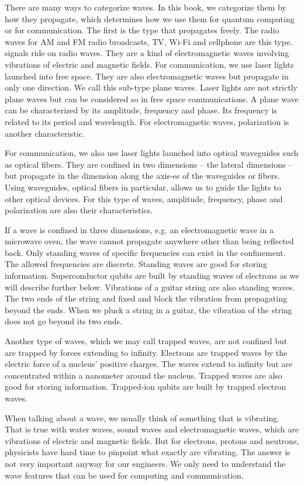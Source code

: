 \documentclass{book}
\begin{document}
There are many ways to categorize waves. In this book, we categorize them by how they propagate, which determines how we use them for quantum computing or for communication. The first is the type that propagates freely. The radio waves for AM and FM radio broadcasts, TV, Wi-Fi and cellphone are this type. signals ride on radio waves. They are a kind of electromagnetic waves involving vibrations of electric and magnetic fields. For communication, we use laser lights launched into free space. They are also electromagnetic waves but propagate in only one direction. We call this sub-type plane waves. Laser lights are not strictly plane waves but can be considered so in free space communications. A plane wave can be characterized by its amplitude, frequency and phase. Its frequency is related to its period and wavelength. For electromagnetic waves, polarization is another characteristic.

For communication, we also use laser lights launched into optical waveguides such as optical fibers. They are confined in two dimensions -- the lateral dimensions -- but propagate in the dimension along the axis-es of the waveguides or fibers. Using waveguides, optical fibers in particular, allows us to guide the lights to other optical devices. For this type of waves, amplitude, frequency, phase and polarization are also their characteristics.

If a wave is confined in three dimensions, e.g. an electromagnetic wave in a microwave oven, the wave cannot propagate anywhere other than being reflected back. Only standing waves of specific frequencies can exist in the confinement. The allowed frequencies are discrete. Standing waves are good for storing information. Superconductor qubits are built by standing waves of electrons as we will describe further below. Vibrations of a guitar string are also standing waves. The two ends of the string and fixed and block the vibration from propagating beyond the ends. When we pluck a string in a guitar, the vibration of the string does not go beyond its two ends.

Another type of waves, which we may call trapped waves, are not confined but are trapped by forces extending to infinity. Electrons are trapped waves by the electric force of a nucleus' positive charges. The waves extend to infinity but are concentrated within a nanometer around the nucleus. Trapped waves are also good for storing information. Trapped-ion qubits are built by trapped electron waves.

When talking about a wave, we usually think of something that is vibrating. That is true with water waves, sound waves and electromagnetic waves, which are vibrations of electric and magnetic fields. But for electrons, protons and neutrons, physicists have hard time to pinpoint what exactly are vibrating. The answer is not very important anyway for our engineers. We only need to understand the wave features that can be used for computing and communication.
\end{document}
